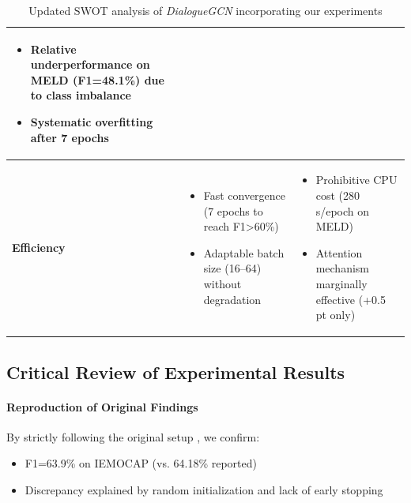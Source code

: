 \documentclass[a4paper,11pt]{article}
\begin{document}
\begin{table}[ht]
\begin{tabular}{l p{6cm} p{6cm}}
\begin{minipage}[t]{6cm}
\begin{itemize}
          \item Relative underperformance on MELD (F1=48.1\%) due to class imbalance \cite{poria-etal-2019-meld}
          \item Systematic overfitting after 7 epochs
        \end{itemize}
      \end{minipage}
    \\
    \midrule
    \textbf{Efficiency} &
      \begin{minipage}[t]{6cm}
        \begin{itemize}
          \item Fast convergence (7 epochs to reach F1>60\%)
          \item Adaptable batch size (16–64) without degradation
        \end{itemize}
      \end{minipage}
    &
      \begin{minipage}[t]{6cm}
        \begin{itemize}
          \item Prohibitive CPU cost (280 s/epoch on MELD)
          \item Attention mechanism marginally effective (+0.5 pt only)
        \end{itemize}
      \end{minipage}
    \\
    \bottomrule
  \end{tabular}
  \caption{Updated SWOT analysis of \emph{DialogueGCN} incorporating our experiments}
  \label{tab:swot}
\end{table}

\subsection{Critical Review of Experimental Results}

\paragraph{Reproduction of Original Findings}
By strictly following the original setup \cite{ghosal2019dialoguegcn}, we confirm:
\begin{itemize}
  \item F1=63.9\% on IEMOCAP (vs. 64.18\% reported)
  \item Discrepancy explained by random initialization and lack of early stopping
\end{itemize}
\end{document}
